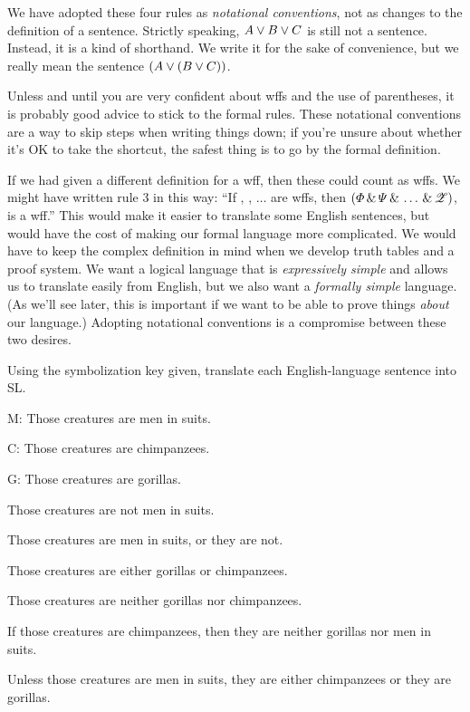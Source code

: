 We have adopted these four rules as \emph{notational conventions}, not as changes to the definition of a sentence. Strictly speaking, $A \vee B \vee C$ is still not a sentence. Instead, it is a kind of shorthand. We write it for the sake of convenience, but we really mean the sentence $(A \vee (B \vee C))$.

Unless and until you are very confident about wffs and the use of parentheses, it is probably good advice to stick to the formal rules. These notational conventions are a way to skip steps when writing things down; if you're unsure about whether it's OK to take the shortcut, the safest thing is to go by the formal definition.

If we had given a different definition for a wff, then these could count as wffs. We might have written rule 3 in this way: ``If \metaA{}, \metaB{}, $\ldots$  are wffs, then $(\varPhi{}\,\&\,\varPsi{}\,\&\,\ldots\,\&\,\mathscr{Z})$, is a wff.'' This would make it easier to translate some English sentences, but would have the cost of making our formal language more complicated. We would have to keep the complex definition in mind when we develop truth tables and a proof system. We want a logical language that is \emph{expressively simple} and allows us to translate easily from English, but we also want a \emph{formally simple} language. (As we'll see later, this is important if we want to be able to prove things \emph{about} our language.) Adopting notational conventions is a compromise between these two desires.



\practiceproblems

\solutions
\problempart Using the symbolization key given, translate each English-language sentence into SL.
\label{pr.monkeysuits}
\begin{ekey}
\item[M:] Those creatures are men in suits. 
\item[C:] Those creatures are chimpanzees. 
\item[G:] Those creatures are gorillas.
\end{ekey}
\begin{earg}
\item Those creatures are not men in suits.
\item Those creatures are men in suits, or they are not.
\item Those creatures are either gorillas or chimpanzees.
\item Those creatures are neither gorillas nor chimpanzees.
\item If those creatures are chimpanzees, then they are neither gorillas nor men in suits.
\item Unless those creatures are men in suits, they are either chimpanzees or they are gorillas.
\end{earg}


